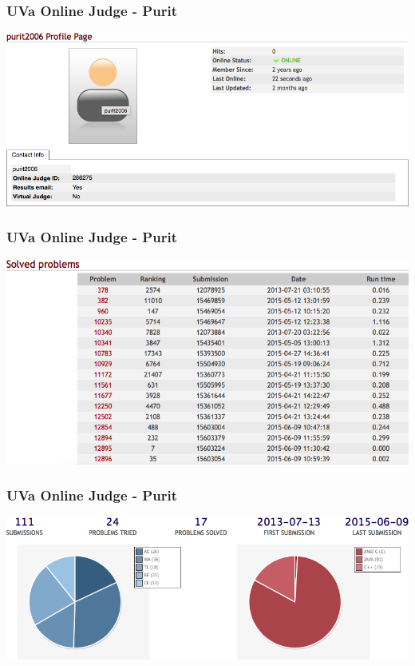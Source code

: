 \documentclass{beamer}
\begin{document}
			\begin{frame}
				\frametitle{UVa Online Judge - Purit}
				\begin{center}
					\includegraphics[scale=0.36]{Profile3} 
				\end{center}
			\end{frame}

			\begin{frame}
				\frametitle{UVa Online Judge - Purit}
				\begin{center}
					\includegraphics[scale=0.38]{Solved3} 
				\end{center}
			\end{frame}

			\begin{frame}
				\frametitle{UVa Online Judge - Purit}
				\begin{center}
					\includegraphics[scale=0.38]{Statistics3} 
				\end{center}
			\end{frame}
\end{document}
